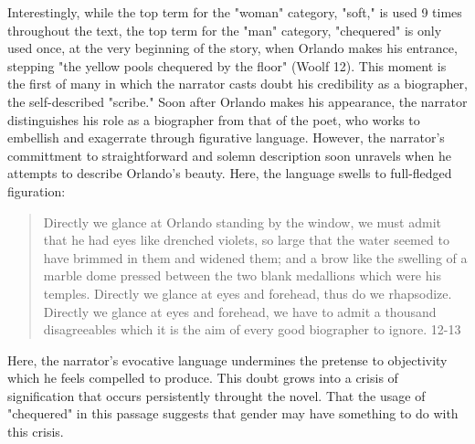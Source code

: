 \documentclass[11pt]{article}
\begin{document}
Interestingly, while the top term for the "woman" category, "soft," is
used 9 times throughout the text, the top term for the "man" category,
"chequered" is only used once, at the very beginning of the story,
when Orlando makes his entrance, stepping "the yellow pools chequered
by the floor" (Woolf 12). This moment is the first of many in which
the narrator casts doubt his credibility as a biographer, the
self-described "scribe." Soon after Orlando makes his appearance, the
narrator distinguishes his role as a biographer from that of the poet,
who works to embellish and exagerrate through figurative
language. However, the narrator's committment to straightforward and
solemn description soon unravels when he attempts to describe
Orlando's beauty. Here, the language swells to full-fledged
figuration:
\begin{quote}
Directly we glance at Orlando standing by the window, we must admit
that he had eyes like drenched violets, so large that the water seemed
to have brimmed in them and widened them; and a brow like the swelling
of a marble dome pressed between the two blank medallions which were
his temples. Directly we glance at eyes and forehead, thus do we
rhapsodize. Directly we glance at eyes and forehead, we have to admit
a thousand disagreeables which it is the aim of every good biographer
to ignore. 12-13
\end{quote}
Here, the narrator's evocative language undermines the pretense to
objectivity which he feels compelled to produce. This doubt grows into
a crisis of signification that occurs persistently throught the
novel. That the usage of "chequered" in this passage suggests that
gender may have something to do with this crisis.
\end{document}
